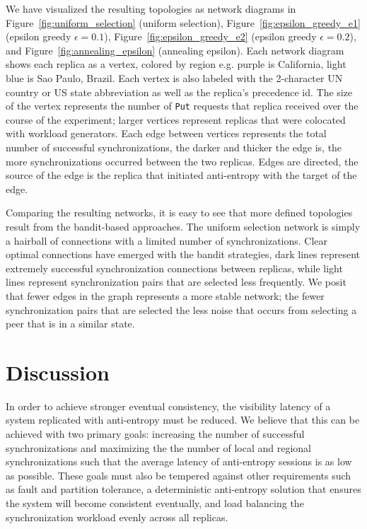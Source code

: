 We have visualized the resulting topologies as network diagrams in
Figure~\ref{fig:uniform_selection} (uniform selection),
Figure~\ref{fig:epsilon_greedy_e1} (epsilon greedy $\epsilon=0.1$),
Figure~\ref{fig:epsilon_greedy_e2} (epsilon greedy $\epsilon=0.2$), and
Figure~\ref{fig:annealing_epsilon} (annealing epsilon).
Each network diagram shows each replica as a vertex, colored by region e.g.
purple is California, light blue is Sao Paulo, Brazil.
Each vertex is also labeled with the 2-character UN country or US state
abbreviation as well as the replica's precedence id.
The size of the vertex represents the number of \texttt{Put} requests that
replica received over the course of the experiment; larger vertices
represent replicas that were colocated with workload generators.
Each edge between vertices represents the total number of successful
synchronizations, the darker and thicker the edge is, the more
synchronizations occurred between the two replicas.
Edges are directed, the source of the edge is the replica that initiated
anti-entropy with the target of the edge.

Comparing the resulting networks, it is easy to see that more defined
topologies result from the bandit-based approaches.
The uniform selection network is simply a hairball of connections with
a limited number of synchronizations.
Clear optimal connections have emerged with the bandit strategies, dark
lines represent extremely successful synchronization connections between
replicas, while light lines represent synchronization pairs that are
selected less frequently.
We posit that fewer edges in the graph represents a more stable network;
the fewer synchronization pairs that are selected the less noise that
occurs from selecting a peer that is in a similar state.

\section*{Discussion}

In order to achieve stronger eventual consistency, the visibility latency
of a system replicated with anti-entropy must be reduced.
We believe that this can be achieved with two primary goals: increasing
the number of successful synchronizations and maximizing the the number
of local and regional synchronizations such that the average latency of
anti-entropy sessions is as low as possible.
These goals must also be tempered against other requirements such as
fault and partition tolerance, a deterministic anti-entropy solution that
ensures the system will become consistent eventually, and load balancing
the synchronization workload evenly across all replicas.


